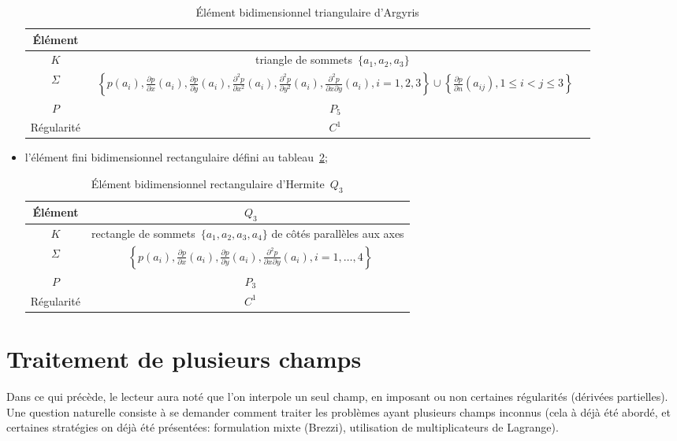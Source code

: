 \begin{itemize}
\begin{table}[h!]
\begin{tabular}{c|cc}
Élément & \\
\hline
$K$	  & triangle de sommets~$\{a_1, a_2, a_3\}$ \\
$\Sigma$ &~$\left\{p(a_i), \frac{\partial p}{\partial x}(a_i), \frac{\partial p}{\partial y}(a_i),
		\frac{\partial^2 p}{\partial x^2}(a_i), \frac{\partial^2 p}{\partial y^2}(a_i),
		\frac{\partial^2 p}{\partial x\partial y}(a_i), i=1, 2, 3\right\}
		\cup\left\{\frac{\partial p}{\partial n}(a_{ij}), 1\le i<j\le3\right\}$\\
$P$   &~$P_5$\\
Régularité &~$C^1$\\
\hline
\end{tabular}
\caption{Élément bidimensionnel triangulaire d'Argyris}\label{tab:ElemA:bi}
\end{table}
\item l'élément fini bidimensionnel rectangulaire défini au tableau~\ref{tab:ElemH:bibi};

\begin{table}[h!]\centering\small
\begin{tabular}{c|c}
Élément &~$Q_3$ \\
\hline
$K$	  & rectangle de sommets~$\{a_1, a_2, a_3, a_4\}$ de côtés parallèles aux axes\\
$\Sigma$ &~$\left\{p(a_i), \frac{\partial p}{\partial x}(a_i), \frac{\partial p}{\partial y}(a_i),
	\frac{\partial^2 p}{\partial x\partial y}(a_i), i=1,\ldots, 4\right\}$\\
$P$   &~$P_3$ \\
Régularité &~$C^1$\\
\hline
\end{tabular}
\caption{Élément bidimensionnel rectangulaire d'Hermite~$Q_3$}\label{tab:ElemH:bibi}
\end{table}
\end{itemize}

\medskip
\section{Traitement de plusieurs champs}\label{Sec-interf}
Dans ce qui précède, le lecteur aura noté que l'on interpole un seul champ, en imposant ou non certaines régularités (dérivées partielles).
Une question naturelle consiste à se demander comment traiter les problèmes ayant plusieurs champs inconnus (cela à déjà été abordé, et certaines stratégies on déjà été présentées: formulation mixte (Brezzi), utilisation de multiplicateurs de Lagrange).

